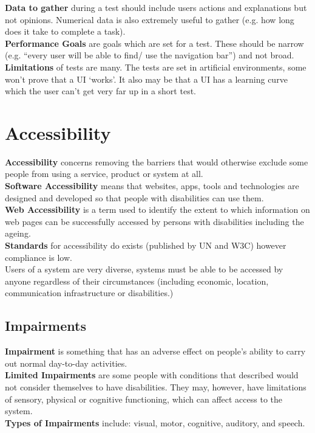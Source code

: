 \documentclass[a4paper,11pt]{article}
\begin{document}
\textbf{Data to gather} during a test should include users actions and explanations but not opinions. Numerical data is also extremely useful to gather (e.g. how long does it take to complete a task).\\
\textbf{Performance Goals} are goals which are set for a test. These should be narrow (e.g. ``every user will be able to find/ use the navigation bar'') and not broad.\\
\textbf{Limitations} of tests are many. The tests are set in artificial environments, some won't prove that a UI `works'. It also may be that a UI has a learning curve which the user can't get very far up in a short test. 

\section{Accessibility}
\textbf{Accessibility} concerns removing the barriers that would otherwise exclude some people from using a service, product or system at all.\\
\textbf{Software Accessibility} means that websites, apps, tools and technologies are designed and developed so that people with disabilities can use them.\\
\textbf{Web Accessibility} is a term used to identify the extent to which information on web pages can be successfully accessed by persons with disabilities including the ageing.\\
\textbf{Standards} for accessibility do exists (published by UN and W3C) however compliance is low.\\
Users of a system are very diverse, systems must be able to be accessed by anyone regardless of their circumstances (including economic, location, communication infrastructure or disabilities.)

\subsection{Impairments}
\textbf{Impairment} is something that has an adverse effect on people's ability to carry out normal day-to-day activities.\\
\textbf{Limited Impairments} are some people with conditions that described would not consider themselves to have disabilities. They may, however, have limitations of sensory, physical or cognitive functioning, which can affect access to the system.\\
\textbf{Types of Impairments} include: visual, motor, cognitive, auditory, and speech.
\end{document}
